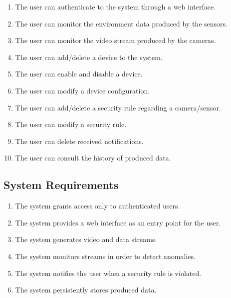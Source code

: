 \documentclass{scrartcl}
\begin{document}
    \begin{enumerate}
        \item \label{itm:user-1} The user can authenticate to the system through a web interface.
        \item \label{itm:user-2} The user can monitor the environment data produced by the sensors.
        \item \label{itm:user-3} The user can monitor the video stream produced by the cameras.
        \item \label{itm:user-4} The user can add/delete a device to the system.
        \item \label{itm:user-5} The user can enable and disable a device.
        \item \label{itm:user-6} The user can modify a device configuration.
        \item \label{itm:user-7} The user can add/delete a security rule regarding a camera/sensor.
        \item \label{itm:user-8} The user can modify a security rule.
        \item \label{itm:user-9} The user can delete received notifications.
        \item \label{itm:user-10} The user can consult the history of produced data.
    \end{enumerate}

    \subsection{System Requirements}\label{subsec:system-requirements}
    \begin{enumerate}
        \item \label{itm:sys-1} The system grants access only to authenticated users.
        \item \label{itm:sys-2} The system provides a web interface as an entry point for the user.
        \item \label{itm:sys-3} The system generates video and data streams.
        \item \label{itm:sys-4} The system monitors streams in order to detect anomalies.
        \item \label{itm:sys-5} The system notifies the user when a security rule is violated.
        \item \label{itm:sys-6} The system persistently stores produced data.
    \end{enumerate}
\end{document}
